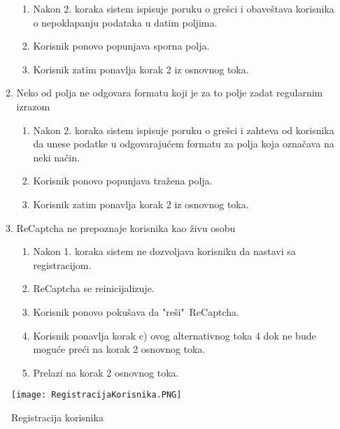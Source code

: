 \documentclass[a4paper]{article}
\begin{document}
\begin{itemize}
\begin{enumerate}
\begin{enumerate}
                    \item Nakon 2. koraka sistem ispisuje poruku o grešci i obaveštava korisnika o nepoklapanju podataka u datim poljima.
                    \item Korisnik ponovo popunjava sporna polja.
                    \item Korisnik zatim ponavlja korak 2 iz osnovnog toka.
                \end{enumerate}
            \item Neko od polja ne odgovara formatu koji je za to polje zadat regularnim izrazom
                \begin{enumerate}
                    \item Nakon 2. koraka sistem ispisuje poruku o grešci i zahteva od korisnika da unese podatke u odgovarajućem formatu za polja koja označava na neki način.
                    \item Korisnik ponovo popunjava tražena polja.
                    \item Korisnik zatim ponavlja korak 2 iz osnovnog toka.
                \end{enumerate}
            \item ReCaptcha ne prepoznaje korisnika kao živu osobu
                \begin{enumerate}
                    \item Nakon 1. koraka sistem ne dozvoljava korisniku da nastavi sa registracijom.
                    \item ReCaptcha se reinicijalizuje.
                    \item Korisnik ponovo pokušava da "reši"\ ReCaptcha.
                    \item Korisnik ponavlja korak c) ovog alternativnog toka 4 dok ne bude moguće preći na korak 2 osnovnog toka.
                    \item Prelazi na korak 2 osnovnog toka.
                \end{enumerate}
        \end{enumerate}
\end{itemize}


\begin{figure}[hbt!]
    \centering
    \texttt{[image: RegistracijaKorisnika.PNG]}
    \caption{Registracija korisnika}
    \label{fig:my_label}
\end{figure}
\end{document}
